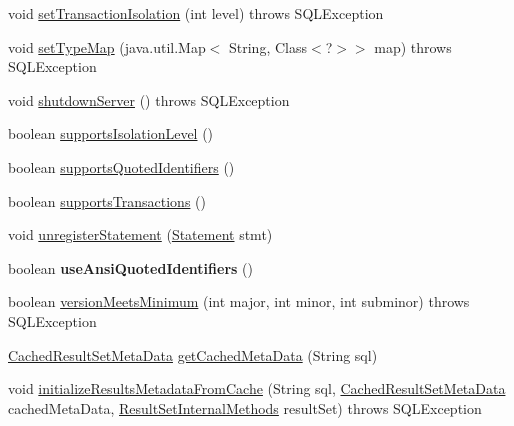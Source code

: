 \begin{DoxyCompactItemize}
\item 
void \mbox{\hyperlink{classcom_1_1mysql_1_1jdbc_1_1_connection_impl_afdba9c661537b2fddb5e4987f5b5538f}{set\+Transaction\+Isolation}} (int level)  throws S\+Q\+L\+Exception 
\item 
void \mbox{\hyperlink{classcom_1_1mysql_1_1jdbc_1_1_connection_impl_a0b2be15b1d06a182b30cae87bdfcf91b}{set\+Type\+Map}} (java.\+util.\+Map$<$ String, Class$<$?$>$$>$ map)  throws S\+Q\+L\+Exception 
\item 
void \mbox{\hyperlink{classcom_1_1mysql_1_1jdbc_1_1_connection_impl_a3c07294052ff8c623efdb0478dff6cde}{shutdown\+Server}} ()  throws S\+Q\+L\+Exception 
\item 
boolean \mbox{\hyperlink{classcom_1_1mysql_1_1jdbc_1_1_connection_impl_a37c633847df022332f4c4648d28a1048}{supports\+Isolation\+Level}} ()
\item 
boolean \mbox{\hyperlink{classcom_1_1mysql_1_1jdbc_1_1_connection_impl_a0deb8354645d646aae3867f050d9b42e}{supports\+Quoted\+Identifiers}} ()
\item 
boolean \mbox{\hyperlink{classcom_1_1mysql_1_1jdbc_1_1_connection_impl_a05086bca661351f54f5512f894effe81}{supports\+Transactions}} ()
\item 
void \mbox{\hyperlink{classcom_1_1mysql_1_1jdbc_1_1_connection_impl_ae3bb2f74be0e7ef1eaf6bc1f6b31c1ec}{unregister\+Statement}} (\mbox{\hyperlink{interfacecom_1_1mysql_1_1jdbc_1_1_statement}{Statement}} stmt)
\item 
\mbox{\label{classcom_1_1mysql_1_1jdbc_1_1_connection_impl_a475df247a1c56029efd4e1d9bd4b8b49}} 
boolean {\bfseries use\+Ansi\+Quoted\+Identifiers} ()
\item 
boolean \mbox{\hyperlink{classcom_1_1mysql_1_1jdbc_1_1_connection_impl_ac3cf366e43f103cfc8b29b81a2a1d25e}{version\+Meets\+Minimum}} (int major, int minor, int subminor)  throws S\+Q\+L\+Exception 
\item 
\mbox{\hyperlink{classcom_1_1mysql_1_1jdbc_1_1_cached_result_set_meta_data}{Cached\+Result\+Set\+Meta\+Data}} \mbox{\hyperlink{classcom_1_1mysql_1_1jdbc_1_1_connection_impl_a705925b76b3f0c60f84c8dd8b19db331}{get\+Cached\+Meta\+Data}} (String sql)
\item 
void \mbox{\hyperlink{classcom_1_1mysql_1_1jdbc_1_1_connection_impl_acea96558aaef2215c71b79e7dbbb9701}{initialize\+Results\+Metadata\+From\+Cache}} (String sql, \mbox{\hyperlink{classcom_1_1mysql_1_1jdbc_1_1_cached_result_set_meta_data}{Cached\+Result\+Set\+Meta\+Data}} cached\+Meta\+Data, \mbox{\hyperlink{interfacecom_1_1mysql_1_1jdbc_1_1_result_set_internal_methods}{Result\+Set\+Internal\+Methods}} result\+Set)  throws S\+Q\+L\+Exception 
$$
\end{DoxyCompactItemize}
